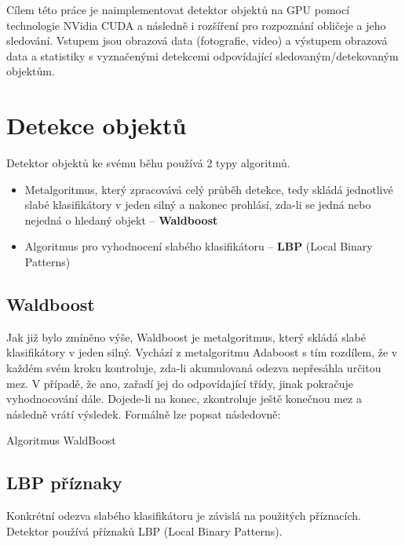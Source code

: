 \documentclass[12pt,a4paper,titlepage,final]{report}
\begin{document}
Cílem této práce je naimplementovat detektor objektů na GPU pomocí technologie NVidia CUDA a následně i rozšíření pro rozpoznání obličeje a jeho sledování. Vstupem jsou obrazová data (fotografie, video) a výstupem obrazová data a statistiky s vyznačenými detekcemi odpovídající sledovaným/detekovaným objektům.

\section{Detekce objektů}

Detektor objektů ke svému běhu používá 2 typy algoritmů. 

\begin{itemize}
	\item Metalgoritmus, který zpracovává celý průběh detekce, tedy skládá jednotlivé slabé klasifikátory v jeden silný a nakonec prohlásí, zda-li se jedná nebo nejedná o hledaný objekt – \textbf{Waldboost}
	\item 	Algoritmus pro vyhodnocení slabého klasifikátoru – \textbf{LBP} (Local Binary Patterns)
	\end{itemize}

\subsection{Waldboost}
Jak již bylo zmíněno výše, Waldboost je metalgoritmus, který skládá slabé klasifikátory v jeden silný. Vychází z metalgoritmu Adaboost s tím rozdílem, že v každém svém kroku kontroluje, zda-li akumulovaná odezva nepřesáhla určitou mez. V případě, že ano, zařadí jej do odpovídající třídy, jinak pokračuje vyhodnocování dále. Dojede-li na konec, zkontroluje ještě konečnou mez a následně vrátí výsledek. Formálně lze popsat následovně:

\begin{algorithm}
\caption{Algoritmus WaldBoost}
\end{algorithm}

\subsection{LBP příznaky}
Konkrétní odezva slabého klasifikátoru je závislá na použitých příznacích. Detektor používá příznaků LBP (Local Binary Patterns).
\end{document}
